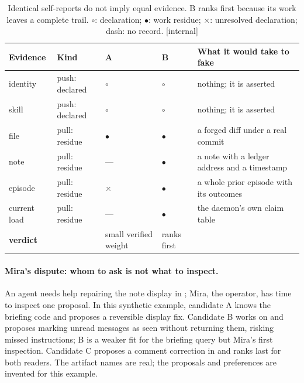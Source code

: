\documentclass[11pt,a4paper]{article}
\theoremstyle{definition}
\theoremstyle{plain}
\begin{document}
\begin{table}[H]
\centering
\caption{Identical self-reports do not imply equal evidence. B ranks first because its work leaves a complete trail. $\circ$: declaration; $\bullet$: work residue; $\times$: unresolved declaration; dash: no record. [internal]}
\label{tab:ls-pushpull}
\small
\renewcommand{\arraystretch}{1.15}
\begin{tabularx}{\linewidth}{@{}l l >{\centering\arraybackslash}p{1.7cm} >{\centering\arraybackslash}p{1.7cm} >{\raggedright\arraybackslash}X@{}}
\toprule
\textbf{Evidence} & \textbf{Kind} & \textbf{A} & \textbf{B} & \textbf{What it would take to fake} \\
\midrule
identity & push: declared & $\circ$ & $\circ$ & nothing; it is asserted \\
skill & push: declared & $\circ$ & $\circ$ & nothing; it is asserted \\
file & pull: residue & $\bullet$ & $\bullet$ & a forged diff under a real commit \\
note & pull: residue & --- & $\bullet$ & a note with a ledger address and a timestamp \\
episode & pull: residue & $\times$ & $\bullet$ & a whole prior episode with its outcomes \\
current load & pull: residue & --- & $\bullet$ & the daemon's own claim table \\
\midrule
\textbf{verdict} & & small verified weight & ranks first & \\
\bottomrule
\end{tabularx}
\end{table}

\paragraph{Mira's dispute: whom to ask is not what to inspect.}
An agent needs help repairing the note display in ;
Mira, the operator, has time to inspect one proposal. In this synthetic
example, candidate A knows the briefing code and proposes a reversible
display fix. Candidate B works on  and proposes
marking unread messages as seen without returning them, risking missed
instructions; B is a weaker fit for the briefing query but Mira's first
inspection. Candidate C proposes a comment correction in
 and ranks last for both readers. The artifact
names are real; the proposals and preferences are invented for this example.
\end{document}
